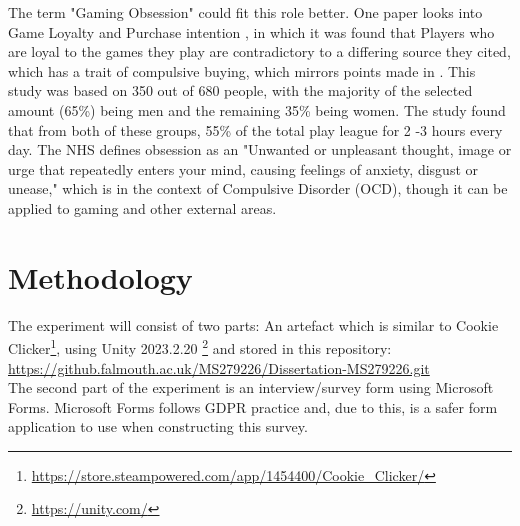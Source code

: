 \documentclass[conference]{IEEEtran}
\begin{document}
The term "Gaming Obsession" could fit this role better. One paper looks into Game Loyalty and Purchase intention \cite{Ramli2022}, in which it was found that Players who are loyal to the games they play are contradictory to a differing source they cited\cite{Widodo2020}, which has a trait of compulsive buying, which mirrors points made in \cite{yasir2021}.  This study was based on 350 out of 680 people, with the majority of the selected amount (65\%) being men and the remaining 35\% being women. The study found that from both of these groups, 55\% of the total play league for 2 -3 hours every day. The NHS  \cite{NHS2021} defines obsession as an "Unwanted or unpleasant thought, image or urge that repeatedly enters your mind, causing feelings of anxiety, disgust or unease," which is in the context of Compulsive Disorder (OCD), though it can be applied to gaming and other external areas.\\

\section{Methodology}
 The experiment will consist of two parts: An artefact which is similar to Cookie Clicker\footnote{\url{https://store.steampowered.com/app/1454400/Cookie_Clicker/}}, using Unity 2023.2.20  \footnote{\url{https://unity.com/}} and stored in this repository:\\

\url{https://github.falmouth.ac.uk/MS279226/Dissertation-MS279226.git}\\

The second part of the experiment is an interview/survey form using Microsoft Forms. Microsoft Forms follows GDPR practice and, due to this, is a safer form application to use when constructing this survey.
\end{document}
